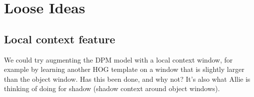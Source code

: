 \section{Loose Ideas}

\subsection{Local context feature}
We could try augmenting the DPM model with a local context window, for example by learning another HOG template on a window that is slightly larger than the object window.
Has this been done, and why not?
It's also what Allie is thinking of doing for shadow (shadow context around object windows).

